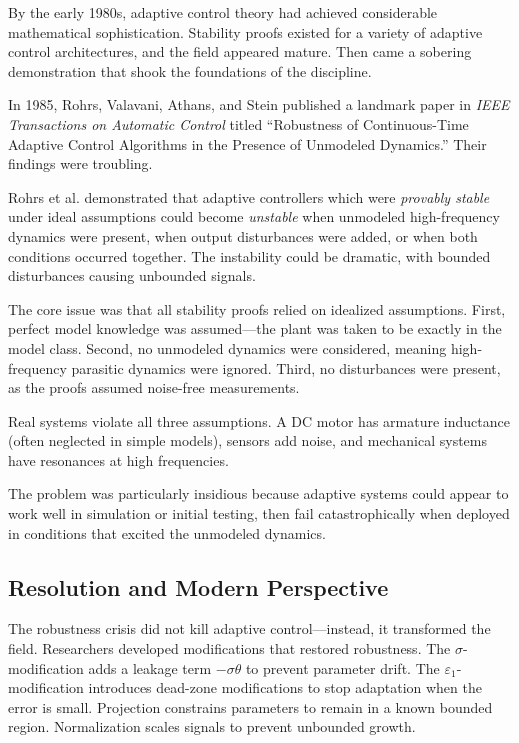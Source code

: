 By the early 1980s, adaptive control theory had achieved considerable mathematical sophistication. Stability proofs existed for a variety of adaptive control architectures, and the field appeared mature. Then came a sobering demonstration that shook the foundations of the discipline.

In 1985, Rohrs, Valavani, Athans, and Stein published a landmark paper in \textit{IEEE Transactions on Automatic Control} titled ``Robustness of Continuous-Time Adaptive Control Algorithms in the Presence of Unmodeled Dynamics.'' Their findings were troubling.

\begin{warningbox}[title=Rohrs' Counterexample, sharp corners]
Rohrs et al. demonstrated that adaptive controllers which were \textit{provably stable} under ideal assumptions could become \textit{unstable} when unmodeled high-frequency dynamics were present, when output disturbances were added, or when both conditions occurred together. The instability could be dramatic, with bounded disturbances causing unbounded signals.
\end{warningbox}

The core issue was that all stability proofs relied on idealized assumptions. First, perfect model knowledge was assumed---the plant was taken to be exactly in the model class. Second, no unmodeled dynamics were considered, meaning high-frequency parasitic dynamics were ignored. Third, no disturbances were present, as the proofs assumed noise-free measurements.

Real systems violate all three assumptions. A DC motor has armature inductance (often neglected in simple models), sensors add noise, and mechanical systems have resonances at high frequencies.

The problem was particularly insidious because adaptive systems could appear to work well in simulation or initial testing, then fail catastrophically when deployed in conditions that excited the unmodeled dynamics.

\subsection{Resolution and Modern Perspective}

The robustness crisis did not kill adaptive control---instead, it transformed the field. Researchers developed modifications that restored robustness. The $\sigma$-modification adds a leakage term $-\sigma\theta$ to prevent parameter drift. The $\varepsilon_1$-modification introduces dead-zone modifications to stop adaptation when the error is small. Projection constrains parameters to remain in a known bounded region. Normalization scales signals to prevent unbounded growth.

